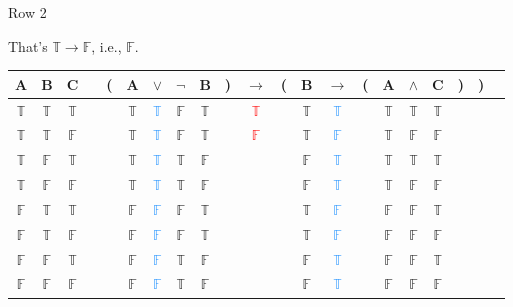 \documentclass[
  ignorenonframetext,
]{beamer}
\renewcommand{\,}{\text{, }}
\def\True{\mathbb{T}}
\def\False{\mathbb{F}}
\begin{document}
\begin{frame}{Row 2}
\protect\hypertarget{row-2-1}{}

That's \(\True \rightarrow \False\), i.e., \(\False\).

\begin{center}
\bigskip
\begin{tabular}{@{ }c@{ }@{ }c@{ }@{ }c | c@{ }@{}c@{}@{ }c@{ }@{ }c@{ }@{ }c@{ }@{ }c@{ }@{}c@{}@{ }c@{ }@{}c@{}@{ }c@{ }@{ }c@{ }@{}c@{}@{ }c@{ }@{ }c@{ }@{ }c@{ }@{}c@{}@{}c@{}@{ }c}
A & B & C &  & ( & A & $\vee$ & $\neg$ & B & ) & $\rightarrow$ & ( & B & $\rightarrow$ & ( & A & $\wedge$ & C & ) & ) & \\
\hline 
 $\True$ & $\True$ & $\True$ &  &  & $\True$ & \textcolor{dodgerblue}{$\True$} & $\False$ & $\True$ &  &\textcolor{red}{$\True$}&  & $\True$ & \textcolor{dodgerblue}{$\True$} &  & $\True$ & $\True$ & $\True$ &  &  & \\
 $\True$ & $\True$ & $\False$ &  &  & $\True$ & \textcolor{dodgerblue}{$\True$} & $\False$ & $\True$ &  &\textcolor{red}{$\False$}&  & $\True$ & \textcolor{dodgerblue}{$\False$} &  & $\True$ & $\False$ & $\False$ &  &  & \\
 $\True$ & $\False$ & $\True$ &  &  & $\True$ & \textcolor{dodgerblue}{$\True$} & $\True$ & $\False$ &  &&  & $\False$ & \textcolor{dodgerblue}{$\True$} &  & $\True$ & $\True$ & $\True$ &  &  & \\
 $\True$ & $\False$ & $\False$ &  &  & $\True$ & \textcolor{dodgerblue}{$\True$} & $\True$ & $\False$ &  &&  & $\False$ & \textcolor{dodgerblue}{$\True$} &  & $\True$ & $\False$ & $\False$ &  &  & \\
 $\False$ & $\True$ & $\True$ &  &  & $\False$ & \textcolor{dodgerblue}{$\False$} & $\False$ & $\True$ &  &&  & $\True$ & \textcolor{dodgerblue}{$\False$} &  & $\False$ & $\False$ & $\True$ &  &  & \\
 $\False$ & $\True$ & $\False$ &  &  & $\False$ & \textcolor{dodgerblue}{$\False$} & $\False$ & $\True$ &  &&  & $\True$ & \textcolor{dodgerblue}{$\False$} &  & $\False$ & $\False$ & $\False$ &  &  & \\
 $\False$ & $\False$ & $\True$ &  &  & $\False$ & \textcolor{dodgerblue}{$\False$} & $\True$ & $\False$ &  &&  & $\False$ & \textcolor{dodgerblue}{$\True$} &  & $\False$ & $\False$ & $\True$ &  &  & \\
 $\False$ & $\False$ & $\False$ &  &  & $\False$ & \textcolor{dodgerblue}{$\False$} & $\True$ & $\False$ &  &&  & $\False$ & \textcolor{dodgerblue}{$\True$} &  & $\False$ & $\False$ & $\False$ &  &  & \\
\end{tabular}
\bigskip
\end{center}

\end{frame}
\end{document}
